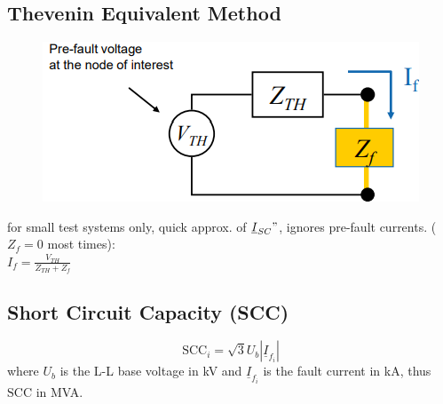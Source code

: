 \documentclass[a4paper,10pt,landscape]{scrartcl}
\begin{document}
\begin{multicols*}{3}
\subsection{Thevenin Equivalent Method}
\begin{figure}
    \centering
    \includegraphics[width=\linewidth]{src/Thevenin Equivalent Method.png}
\end{figure}
for small test systems only, quick approx. of $\underline{I}_{SC}"$, ignores pre-fault currents. ($Z_f=0$ most times): \\
$I_f=\frac{V_{TH}}{Z_{TH}+Z_f}$ 

\subsection{Short Circuit Capacity (SCC)}

$$\mathrm{SCC}_i = \sqrt{3}U_{b}|\underline{I}_{f_{i}}|$$
where $U_b$ is the L-L base voltage in kV and $\underline{I}_{f_{i}}$ is the fault current in kA, thus $\mathrm{SCC}$ in MVA.



\end{multicols*}
\end{document}
